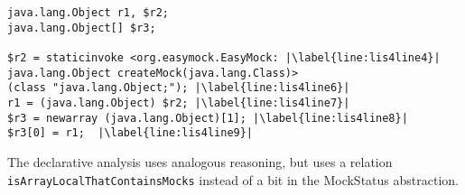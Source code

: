 \begin{lstlisting}[basicstyle=\ttfamily, caption={Jimple Intermediate Representation for the array in Figure~\ref{fig:arrayMockIllustration}.},
basicstyle=\ttfamily, framesep=4.5mm, framexleftmargin=1.0mm, captionpos=b, label=lis:arrayIllustrationIR, escapechar=|, morekeywords={@Test, specialinvoke, virtualinvoke, staticinvoke, newarray}]
java.lang.Object r1, $r2;
java.lang.Object[] $r3;

$r2 = staticinvoke <org.easymock.EasyMock: |\label{line:lis4line4}|
java.lang.Object createMock(java.lang.Class)>
(class "java.lang.Object;"); |\label{line:lis4line6}|
r1 = (java.lang.Object) $r2; |\label{line:lis4line7}|
$r3 = newarray (java.lang.Object)[1]; |\label{line:lis4line8}|
$r3[0] = r1;  |\label{line:lis4line9}|
\end{lstlisting}


The declarative analysis uses analogous reasoning, but uses a relation \\ \texttt{isArrayLocalThatContainsMocks} instead of a bit in the MockStatus abstraction.

